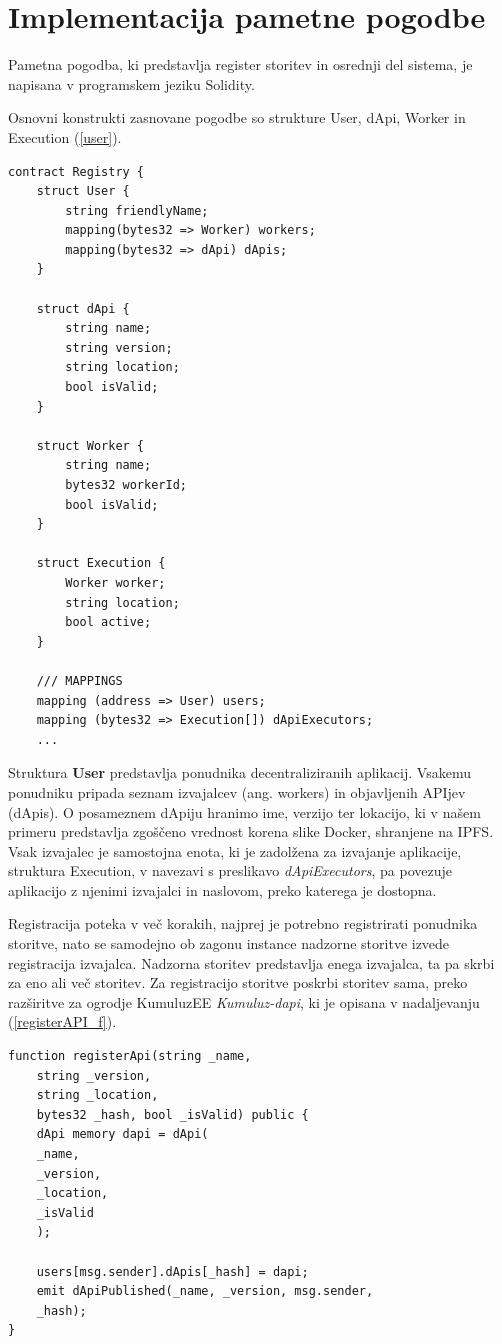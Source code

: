 \documentclass[a4paper, 12pt]{book}
\begin{document}
\section{Implementacija pametne pogodbe}
Pametna pogodba, ki predstavlja register storitev in osrednji del sistema, je napisana v programskem jeziku Solidity.

Osnovni konstrukti zasnovane pogodbe so strukture User, dApi, Worker in Execution (\ref{user}).

\begin{lstlisting}[caption={Osnovni konstrukti pametne pogodbe za decentraliziran register storitev},captionpos=b,label={user}]
contract Registry {
	struct User {
		string friendlyName;
		mapping(bytes32 => Worker) workers;
		mapping(bytes32 => dApi) dApis;
	}
	
	struct dApi {
		string name;
		string version;
		string location;
		bool isValid;
	}
	
	struct Worker {
		string name;
		bytes32 workerId;
		bool isValid;
	}
	
	struct Execution {
		Worker worker;
		string location;
		bool active;
	}
	
 	/// MAPPINGS
	mapping (address => User) users;
	mapping (bytes32 => Execution[]) dApiExecutors;
	...
\end{lstlisting}

Struktura \textbf{User} predstavlja ponudnika decentraliziranih aplikacij.
Vsakemu ponudniku pripada seznam izvajalcev (ang. workers) in objavljenih APIjev (dApis).
O posameznem dApiju hranimo ime, verzijo ter lokacijo, ki v našem primeru predstavlja zgoščeno vrednost korena slike Docker, shranjene na IPFS.
Vsak izvajalec je samostojna enota, ki je zadolžena za izvajanje aplikacije, struktura Execution, v navezavi s preslikavo \textit{dApiExecutors}, pa povezuje aplikacijo z njenimi izvajalci in naslovom, preko katerega je dostopna.

Registracija poteka v več korakih, najprej je potrebno registrirati ponudnika storitve, nato se samodejno ob zagonu instance nadzorne storitve izvede registracija izvajalca.
Nadzorna storitev predstavlja enega izvajalca, ta pa skrbi za eno ali več storitev.
Za registracijo storitve poskrbi storitev sama, preko razširitve za ogrodje KumuluzEE \textit{Kumuluz-dapi}, ki je opisana v nadaljevanju (\ref{registerAPI_f}).

\begin{lstlisting}[caption={Funkcija za registracijo APIja},captionpos=b,label={registerAPI_f}]
function registerApi(string _name,
	string _version,
	string _location,
	bytes32 _hash, bool _isValid) public {
	dApi memory dapi = dApi(
	_name,
	_version,
	_location,
	_isValid
	);
	
	users[msg.sender].dApis[_hash] = dapi;
	emit dApiPublished(_name, _version, msg.sender,
	_hash);
}
\end{lstlisting}
\end{document}
